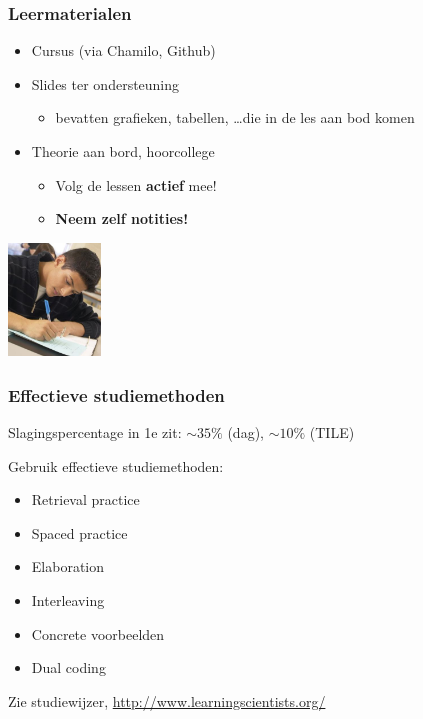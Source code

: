 \documentclass{beamer}
\begin{document}
\begin{frame}
  \frametitle{Leermaterialen}

  \begin{itemize}
    \item Cursus (via Chamilo, Github)
    \item Slides ter ondersteuning
      \begin{itemize}
        \item bevatten grafieken, tabellen, \ldots die in de les aan bod komen
      \end{itemize}
    \item Theorie aan bord, hoorcollege
      \begin{itemize}
        \item Volg de lessen \textbf{actief} mee!
        \item \textbf{Neem zelf notities!}
      \end{itemize}
  \end{itemize}


  \begin{center}
    \includegraphics[height=3cm]{img/intro-06.jpg}
  \end{center}

\end{frame}

\begin{frame}
  \frametitle{Effectieve studiemethoden}
  
  Slagingspercentage in 1e zit: $\sim35\%$ (dag), $\sim10\%$ (TILE)
  
  \vspace{18pt}
  
  Gebruik effectieve studiemethoden:
  
  \begin{itemize}
    \item Retrieval practice
    \item Spaced practice
    \item Elaboration
    \item Interleaving
    \item Concrete voorbeelden
    \item Dual coding
  \end{itemize}

  Zie studiewijzer, \url{http://www.learningscientists.org/}
  
\end{frame}
\end{document}
